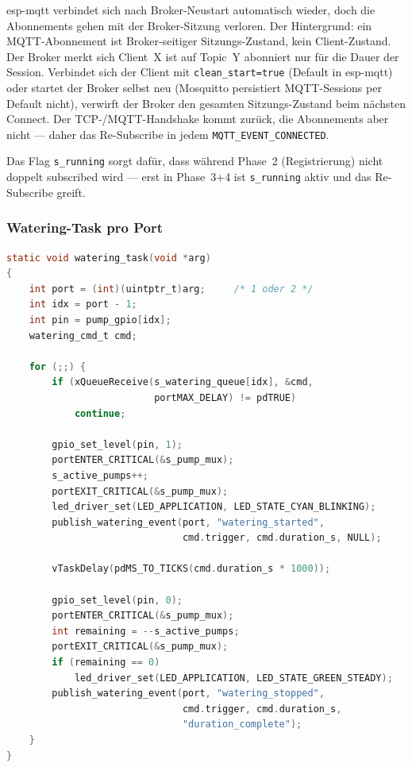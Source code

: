 \documentclass[a4paper,12pt]{article}
\begin{document}
esp-mqtt verbindet sich nach Broker-Neustart automatisch wieder,
doch die Abonnements gehen mit der Broker-Sitzung verloren. Der
Hintergrund: ein MQTT-Abonnement ist Broker-seitiger Sitzungs-Zustand,
kein Client-Zustand. Der Broker merkt sich \glqq Client~X ist auf
Topic~Y abonniert\grqq{} nur für die Dauer der Session. Verbindet
sich der Client mit \texttt{clean\_start=true} (Default in esp-mqtt)
oder startet der Broker selbst neu (Mosquitto persistiert
MQTT-Sessions per Default nicht), verwirft der Broker den gesamten
Sitzungs-Zustand beim nächsten Connect. Der TCP-/MQTT-Handshake
kommt zurück, die Abonnements aber nicht --- daher das
Re-Subscribe in jedem \texttt{MQTT\_EVENT\_CONNECTED}.

Das Flag \texttt{s\_running} sorgt dafür, dass während Phase~2
(Registrierung) nicht doppelt subscribed wird --- erst in Phase~3+4
ist \texttt{s\_running} aktiv und das Re-Subscribe greift.

\subsubsection{Watering-Task pro Port}

\begin{lstlisting}[language=C, caption={Auszug aus
\texttt{mqtt\_manager.c} --- ein Task pro Pumpe für parallele Bewässerung.}]
static void watering_task(void *arg)
{
    int port = (int)(uintptr_t)arg;     /* 1 oder 2 */
    int idx = port - 1;
    int pin = pump_gpio[idx];
    watering_cmd_t cmd;

    for (;;) {
        if (xQueueReceive(s_watering_queue[idx], &cmd,
                          portMAX_DELAY) != pdTRUE)
            continue;

        gpio_set_level(pin, 1);
        portENTER_CRITICAL(&s_pump_mux);
        s_active_pumps++;
        portEXIT_CRITICAL(&s_pump_mux);
        led_driver_set(LED_APPLICATION, LED_STATE_CYAN_BLINKING);
        publish_watering_event(port, "watering_started",
                               cmd.trigger, cmd.duration_s, NULL);

        vTaskDelay(pdMS_TO_TICKS(cmd.duration_s * 1000));

        gpio_set_level(pin, 0);
        portENTER_CRITICAL(&s_pump_mux);
        int remaining = --s_active_pumps;
        portEXIT_CRITICAL(&s_pump_mux);
        if (remaining == 0)
            led_driver_set(LED_APPLICATION, LED_STATE_GREEN_STEADY);
        publish_watering_event(port, "watering_stopped",
                               cmd.trigger, cmd.duration_s,
                               "duration_complete");
    }
}
\end{lstlisting}
\end{document}
